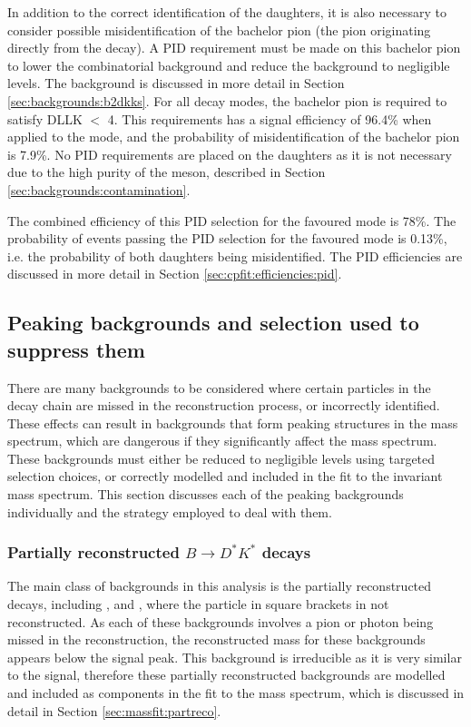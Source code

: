 In addition to the correct identification of the \Dz daughters, it is also necessary to consider possible misidentification of the bachelor pion (the pion originating directly from the \Kstarm decay). A PID requirement must be made on this bachelor pion to lower the combinatorial background and reduce the \decay{\Bm}{\D\KS\Km} background to negligible levels. The \decay{\Bm}{\D\KS\Km} background is discussed in more detail in Section \ref{sec:backgrounds:b2dkks}. For all \Dz decay modes, the bachelor pion is required to satisfy DLLK $<$ 4. This requirements has a signal efficiency of 96.4\% when applied to the \kpi mode, and the probability of misidentification of the bachelor pion is 7.9\%. No PID requirements are placed on the \KS daughters as it is not necessary due to the high purity of the \KS meson, described in Section \ref{sec:backgrounds:contamination}. 

The combined efficiency of this PID selection for the \kpi favoured mode is 78\%. The probability of \pik events passing the PID selection for the favoured mode is 0.13\%, i.e. the probability of both \Dz daughters being misidentified. The PID efficiencies are discussed in more detail in Section \ref{sec:cpfit:efficiencies:pid}. 

\subsection{Peaking backgrounds and selection used to suppress them}
\label{sec:backgrounds}

There are many backgrounds to be considered where certain particles in the decay chain are missed in the reconstruction process, or incorrectly identified. These effects can result in backgrounds that form peaking structures in the \Bm mass spectrum, which are dangerous if they significantly affect the \Bm mass spectrum. These backgrounds must either be reduced to negligible levels using targeted selection choices, or correctly modelled and included in the fit to the invariant \Bm mass spectrum. This section discusses each of the peaking backgrounds individually and the strategy employed to deal with them.

\subsubsection{Partially reconstructed \boldmath$B \to D^*K^*$ decays}
\label{sec:backgrounds:partreco}

The main class of backgrounds in this analysis is the partially reconstructed \decay{\B}{\Dstar\Kstar} decays, including \decay{\Bm}{(\decay{\Dstarz}{\Dz[\piz]})\Kstarm}, \decay{\Bm}{(\decay{\Dstarz}{\Dz[\gamma]})\Kstarm} and \decay{\Bd}{(\decay{\Dstarp}{\Dz[\pip]})\Kstarm}, where the particle in square brackets in not reconstructed. As each of these backgrounds involves a pion or photon being missed in the reconstruction, the reconstructed \Bm mass for these backgrounds appears below the signal peak. This background is irreducible as it is very similar to the signal, therefore these partially reconstructed backgrounds are modelled and included as components in the fit to the \Bm mass spectrum, which is discussed in detail in Section \ref{sec:massfit:partreco}.

